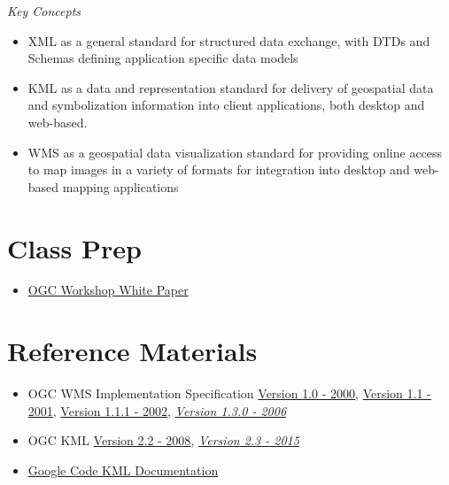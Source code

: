 \documentclass[]{book}
\providecommand{\tightlist}{%
  \setlength{\itemsep}{0pt}\setlength{\parskip}{0pt}}
\begin{document}
\emph{Key Concepts}

\begin{itemize}
\item
  XML as a general standard for structured data exchange, with DTDs and
  Schemas defining application specific data models
\item
  KML as a data and representation standard for delivery of geospatial
  data and symbolization information into client applications, both
  desktop and web-based.
\item
  WMS as a geospatial data visualization standard for providing online
  access to map images in a variety of formats for integration into
  desktop and web-based mapping applications
\end{itemize}

\section{Class Prep}\label{week06-prep}

\begin{itemize}
\tightlist
\item
  \href{http://karlbenedict.com/documents/ogcworkshop.pdf}{OGC Workshop
  White Paper}
\end{itemize}

\section{Reference Materials}\label{week06-reference}

\begin{itemize}
\item
  OGC WMS Implementation Specification
  \href{http://portal.opengeospatial.org/files/?artifact_id=7196}{Version
  1.0 - 2000},
  \href{http://portal.opengeospatial.org/files/?artifact_id=1058}{Version
  1.1 - 2001},
  \href{http://portal.opengeospatial.org/files/?artifact_id=1081\&version=1\&format=pdf}{Version
  1.1.1 - 2002},
  \href{http://portal.opengeospatial.org/files/?artifact_id=14416}{\emph{Version
  1.3.0 - 2006}}
\item
  OGC KML
  \href{http://portal.opengeospatial.org/files/?artifact_id=27810}{Version
  2.2 - 2008},
  \href{http://docs.opengeospatial.org/is/12-007r2/12-007r2.html}{\emph{Version
  2.3 - 2015}}
\item
  \href{https://developers.google.com/kml/documentation/}{Google Code
  KML Documentation}
\end{itemize}
\end{document}
